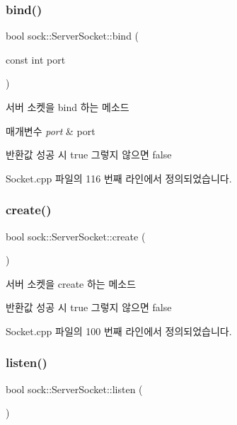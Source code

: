 \subsubsection{\texorpdfstring{bind()}{bind()}}
{\footnotesize\ttfamily bool sock\+::\+Server\+Socket\+::bind (\begin{DoxyParamCaption}\item[{const int}]{port }\end{DoxyParamCaption})}



서버 소켓을 bind 하는 메소드 


\begin{DoxyParams}{매개변수}
{\em port} & port \\
\hline
\end{DoxyParams}
\begin{DoxyReturn}{반환값}
성공 시 true 그렇지 않으면 false 
\end{DoxyReturn}


Socket.\+cpp 파일의 116 번째 라인에서 정의되었습니다.

\mbox{\label{classsock_1_1_server_socket_acaf072e165087c2a2cba2d1f078d8750}} 
\subsubsection{\texorpdfstring{create()}{create()}}
{\footnotesize\ttfamily bool sock\+::\+Server\+Socket\+::create (\begin{DoxyParamCaption}{ }\end{DoxyParamCaption})}



서버 소켓을 create 하는 메소드 

\begin{DoxyReturn}{반환값}
성공 시 true 그렇지 않으면 false 
\end{DoxyReturn}


Socket.\+cpp 파일의 100 번째 라인에서 정의되었습니다.

\mbox{\label{classsock_1_1_server_socket_a3b3431968400296b8b7f9a73dd7c27bc}} 
\subsubsection{\texorpdfstring{listen()}{listen()}}
{\footnotesize\ttfamily bool sock\+::\+Server\+Socket\+::listen (\begin{DoxyParamCaption}{ }\end{DoxyParamCaption})}



